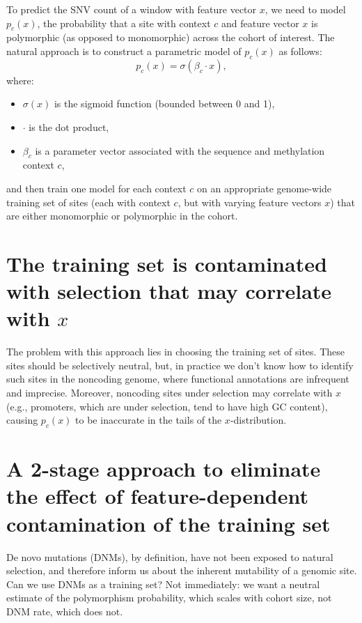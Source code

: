 \documentclass{article}
\begin{document}
To predict the SNV count of a window with feature vector $x$, we need to 
model $p_c(x)$, the probability that a site with context $c$ 
and feature vector $x$ is polymorphic (as opposed to monomorphic) across 
the cohort of interest. 
The natural approach is to 
construct a parametric model of $p_c(x)$ as follows: 
\begin{equation} 
    p_c(x) = \sigma(\beta_c \cdot x),
    \label{eq:joint_model}
\end{equation}
where: 
\begin{itemize}
    \item $\sigma(x)$ is the sigmoid function (bounded between 0 and 1), 
    \item $\cdot$ is the dot product,
    \item $\beta_c$ is a parameter vector associated with the sequence and methylation context $c$,
\end{itemize}
and then train one model for each context $c$ on an appropriate genome-wide 
training set of sites 
(each with context $c$, but with varying feature vectors $x$) 
that are either monomorphic or polymorphic in the cohort. 

\section{The training set is contaminated with selection that may correlate with $x$}

The problem with this approach lies in choosing the training set of sites. 
These sites should be selectively neutral, but, 
in practice we don't know how to identify such sites in the noncoding genome, 
where functional annotations are infrequent and imprecise. 
Moreover, noncoding sites under selection may correlate with $x$
(e.g., promoters, which are under selection, tend to have high GC content), causing $p_c(x)$ 
to be inaccurate in the tails of the $x$-distribution. 

\section{A 2-stage approach to eliminate the effect of feature-dependent contamination of the training set}

De novo mutations (DNMs), by definition, have not
been exposed to natural selection, and therefore
inform us about the inherent mutability of a genomic site. 
Can we use DNMs as a training set? 
Not immediately: we want a neutral 
estimate of the polymorphism probability, which scales with cohort size, 
not DNM rate, which does not. 
\end{document}
